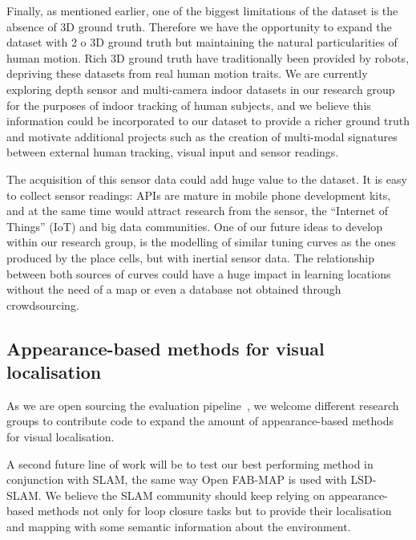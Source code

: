 Finally, as mentioned earlier, one of the biggest limitations of the dataset is the absence of 3D ground truth. Therefore we have the opportunity to expand the dataset with 2 o 3D ground truth but maintaining the natural particularities of human motion. Rich 3D ground truth have traditionally been provided by ro\-bots, depriving these datasets from real human motion traits. We are currently exploring depth sensor and multi-camera indoor datasets in our research group for the purposes of indoor tracking of human subjects, and we believe this information could be incorporated to our dataset to provide a richer ground truth and motivate additional projects such as the creation of multi-modal signatures between external human tracking, visual input and sensor readings.

The acquisition of this sensor data could add huge value to the dataset. It is easy to collect sensor readings: APIs are mature in mobile phone development kits, and at the same time would attract research from the sensor, the ``Internet of Things'' (IoT) and big data communities. One of our future ideas to develop within our research group, is the modelling of similar tuning curves as the ones produced by the place cells, but with inertial sensor data. The relationship between both sources of curves could have a huge impact in learning locations without the need of a map or even a database not obtained through crowdsourcing.

\subsection{Appearance-based methods for visual localisation}
As we are open sourcing the evaluation pipeline~\cite{jose_rivera_rubio_2015_33762}, we welcome different research groups to contribute code to expand the amount of appearance-based methods for visual localisation. 

A second future line of work will be to test our best performing method in conjunction with SLAM, the same way Open FAB-MAP is used with LSD-SLAM. We believe the SLAM community should keep relying on appearance-based methods not only for loop closure tasks but to provide their localisation and mapping with some semantic information about the environment.

